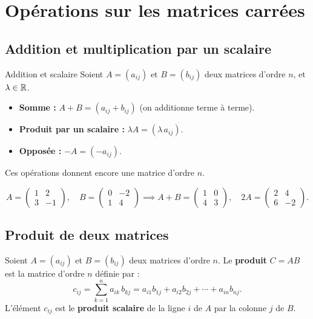 \section{Opérations sur les matrices carrées}

\subsection{Addition et multiplication par un scalaire}

\begin{propriete}{Addition et scalaire}{}
	Soient $A=(a_{ij})$ et $B=(b_{ij})$ deux matrices d'ordre $n$,
	et $\lambda \in \mathbb{R}$.
	\begin{itemize}[label=\textbullet]
		\item \textbf{Somme :} $A+B = (a_{ij}+b_{ij})$ \quad
		(on additionne terme à terme).
		\item \textbf{Produit par un scalaire :} $\lambda A = (\lambda\,a_{ij})$.
		\item \textbf{Opposée :} $-A = (-a_{ij})$.
	\end{itemize}
	Ces opérations donnent encore une matrice d'ordre $n$.
\end{propriete}

\begin{exemple}
	\[
	A=\begin{pmatrix}1&2\\3&-1\end{pmatrix},\quad
	B=\begin{pmatrix}0&-2\\1&4\end{pmatrix}
	\implies
	A+B=\begin{pmatrix}1&0\\4&3\end{pmatrix},\quad
	2A=\begin{pmatrix}2&4\\6&-2\end{pmatrix}.
	\]
\end{exemple}

\subsection{Produit de deux matrices}

\begin{definition}
	Soient $A=(a_{ij})$ et $B=(b_{ij})$ deux matrices d'ordre $n$.
	Le \textbf{produit} $C = AB$ est la matrice d'ordre $n$ définie par :
	\[
	c_{ij} = \sum_{k=1}^{n} a_{ik}\,b_{kj}
	= a_{i1}b_{1j} + a_{i2}b_{2j} + \cdots + a_{in}b_{nj}.
	\]
	L'élément $c_{ij}$ est le \textbf{produit scalaire} de la ligne $i$ de $A$
	par la colonne $j$ de $B$.
\end{definition}

